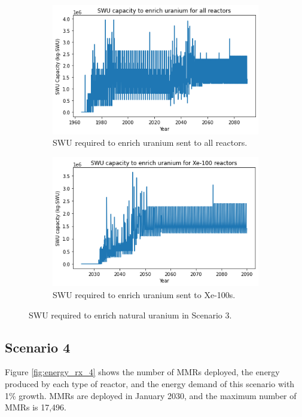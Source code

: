 \begin{figure}
    \centering
    \begin{subfigure}{0.45\textwidth}
        \centering
        \includegraphics[scale=0.4]{../figures/totalswu_scenarios_3.png}
        \caption{\gls{SWU} required to enrich uranium sent to all reactors.}
        \label{fig:totalswu_3}
    \end{subfigure}
    \hspace{0.8cm}
    \begin{subfigure}{0.45\textwidth}
        \centering
        \includegraphics[scale=0.4]{../figures/haleuSWU_scenarios_3.png}
        \caption{\gls{SWU} required to enrich uranium sent to Xe-100s.}
        \label{fig:haleuswu_3}
    \end{subfigure}
    \caption{\gls{SWU} required to enrich natural uranium in Scenario 3.}
    \label{fig:swu_3}
\end{figure}

\subsection{Scenario 4}
Figure \ref{fig:energy_rx_4} shows the number of \glspl{MMR} deployed, the
energy produced by each type of reactor, and the energy demand of this
scenario with 1\% growth. \glspl{MMR} are deployed in January 2030, and the maximum 
number of \glspl{MMR} is 17,496. 

